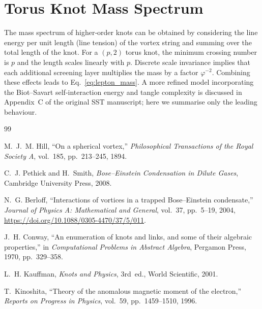 \documentclass[11pt]{article}
\newcommand{\phiG}{\varphi}
\begin{document}
\section{Torus Knot Mass Spectrum}
\label{app:knots}

The mass spectrum of higher‑order knots can be obtained by considering the line energy per unit length (line tension) of the vortex string and summing over the total length of the knot.  For a $(p,2)$ torus knot, the minimum crossing number is $p$ and the length scales linearly with $p$.  Discrete scale invariance implies that each additional screening layer multiplies the mass by a factor $\phiG^{-2}$.  Combining these effects leads to Eq.~\eqref{eq:lepton_mass}.  A more refined model incorporating the Biot–Savart self‑interaction energy and tangle complexity is discussed in Appendix~C of the original SST manuscript; here we summarise only the leading behaviour.

\begin{thebibliography}{99}

 M.~J.~M. Hill, ``On a spherical vortex,'' \emph{Philosophical Transactions of the Royal Society A}, vol.~185, pp.~213--245, 1894.

 C.~J. Pethick and H.~Smith, \emph{Bose--Einstein Condensation in Dilute Gases}, Cambridge University Press, 2008.

 N.~G. Berloff, ``Interactions of vortices in a trapped Bose--Einstein condensate,'' \emph{Journal of Physics A: Mathematical and General}, vol.~37, pp.~5–19, 2004, \url{https://doi.org/10.1088/0305-4470/37/5/011}.

 J.~H. Conway, ``An enumeration of knots and links, and some of their algebraic properties,'' in \emph{Computational Problems in Abstract Algebra}, Pergamon Press, 1970, pp.~329–358.

 L.~H. Kauffman, \emph{Knots and Physics}, 3rd~ed., World Scientific, 2001.

 T.~Kinoshita, ``Theory of the anomalous magnetic moment of the electron,'' \emph{Reports on Progress in Physics}, vol.~59, pp.~1459–1510, 1996.

\end{thebibliography}
\end{document}
